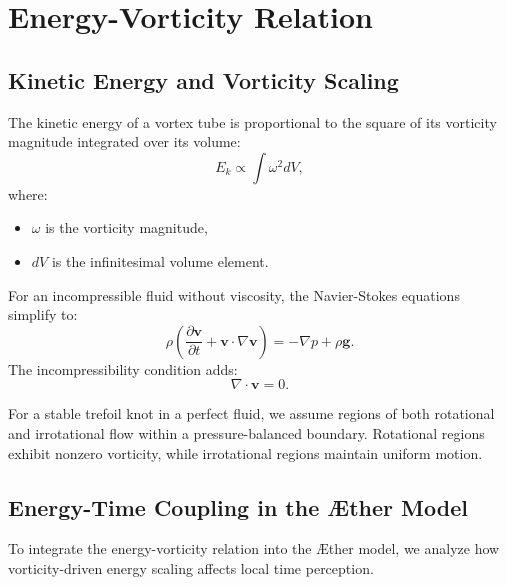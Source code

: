 

    \section{Energy-Vorticity Relation}

    \subsection*{Kinetic Energy and Vorticity Scaling}
    The kinetic energy of a vortex tube is proportional to the square of its vorticity magnitude integrated over its volume:
    \begin{equation*}
        E_k \propto \int \omega^2 dV,
    \end{equation*}
    where:
    \begin{itemize}
        \item $\omega$ is the vorticity magnitude,
        \item $dV$ is the infinitesimal volume element.
    \end{itemize}
    For an incompressible fluid without viscosity, the Navier-Stokes equations simplify to:
    \begin{equation*}
        \rho \left( \frac{\partial \mathbf{v}}{\partial t} + \mathbf{v} \cdot \nabla \mathbf{v} \right) = - \nabla p + \rho \mathbf{g}.
    \end{equation*}
    The incompressibility condition adds:
    \begin{equation*}
        \nabla \cdot \mathbf{v} = 0.
    \end{equation*}

    For a stable trefoil knot in a perfect fluid, we assume regions of both rotational and irrotational flow within a pressure-balanced boundary. Rotational regions exhibit nonzero vorticity, while irrotational regions maintain uniform motion.

    \subsection*{Energy-Time Coupling in the Æther Model}
    To integrate the energy-vorticity relation into the Æther model, we analyze how vorticity-driven energy scaling affects local time perception.

